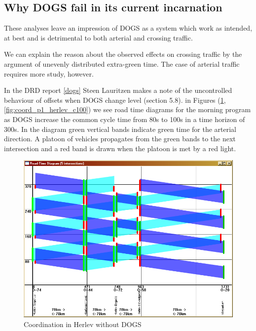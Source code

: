 \subsection*{Why DOGS fail in its current incarnation}
These analyses leave an impression of DOGS as a system which work as intended, at best and is detrimental to both arterial and crossing traffic.

We can explain the reason about the observed effects on crossing traffic by the argument of unevenly distributed extra-green time. The case of arterial traffic requires more study, however.

In the DRD report \ref{dogs} Steen Lauritzen makes a note of the uncontrolled behaviour of offsets when DOGS change level (section 5.8). in Figures (\ref{fig:coord_p1_herlev_c80}, \ref{fig:coord_p1_herlev_c100}) we see road time diagrams for the morning program as DOGS increase the common cycle time from 80s to 100s in a time horizon of 300s. 
In the diagram green vertical bands indicate green time for the arterial direction. A platoon of vehicles propagates from the green bands to the next intersection and a red band is drawn when the platoon is met by a red light.

\begin{figure}[ht]
\begin{center}
\includegraphics[scale=0.30]{coord_p1_herlev_c80.PNG} 
\end{center}
\caption{Coordination in Herlev without DOGS}
\label{fig:coord_p1_herlev_c80}
\end{figure}

